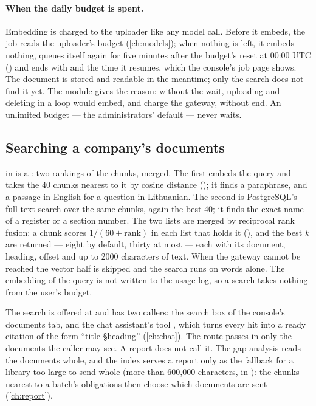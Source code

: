 \paragraph{When the daily budget is spent.} Embedding is charged to the uploader like any
model call. Before it embeds, the job reads the uploader's budget (\cref{ch:models}); when
nothing is left, it embeds nothing, queues itself again for five minutes after the budget's
reset at 00:00 UTC () and ends with  and the
time it resumes, which the console's job page shows. The document is stored and readable in
the meantime; only the search does not find it yet. The module gives the reason: without the
wait, uploading and deleting in a loop would embed, and charge the gateway, without end. An
unlimited budget --- the administrators' default --- never waits.

\subsection{Searching a company's documents}\label{sec:company:search}

 in  is a : two rankings
of the chunks, merged. The first embeds the query and takes the 40 chunks nearest to it by
cosine distance (); it finds a paraphrase, and a passage in English for a
question in Lithuanian. The second is PostgreSQL's full-text search over the same chunks,
again the best 40; it finds the exact name of a register or a section number. The two lists
are merged by reciprocal rank fusion: a chunk scores $1/(60+\text{rank})$ in each list that
holds it (), and the best $k$ are returned --- eight by default, thirty at most ---
each with its document, heading, offset and up to 2000 characters of text. When the gateway
cannot be reached the vector half is skipped and the search runs on words alone. The
embedding of the query is not written to the usage log, so a search takes nothing from the
user's budget.

The search is offered at  and has two callers: the search
box of the console's documents tab, and the chat assistant's tool
, which turns every hit into a ready citation of the form
\enquote{title §heading} (\cref{ch:chat}). The route passes in only the documents the caller
may see. A report does not call it. The gap analysis reads the documents whole, and the
index serves a report only as the fallback for a library too large to send whole (more than
600,000 characters,  in ): the chunks
nearest to a batch's obligations then choose which documents are sent (\cref{ch:report}).


